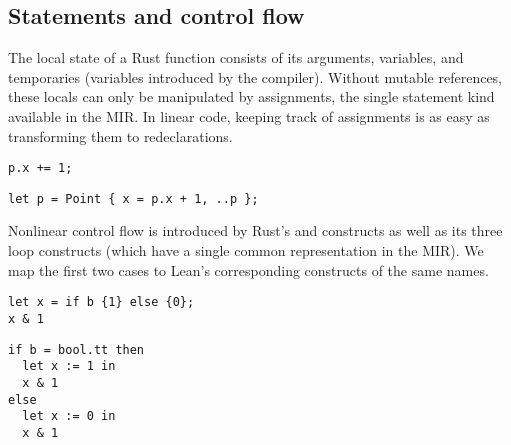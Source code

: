 \subsection{Statements and control flow}

The local state of a Rust function consists of its arguments, variables, and
temporaries (variables introduced by the compiler). Without mutable references,
these locals can only be manipulated by assignments, the single statement kind
available in the MIR. In linear code, keeping track of assignments is as easy as
transforming them to redeclarations.

\vspace{1em}\noindent\begin{minipage}{0.4\textwidth}
  \begin{verbatim}
p.x += 1;
  \end{verbatim}
\end{minipage}
\begin{minipage}{0.6\textwidth}
  \begin{verbatim}
let p = Point { x = p.x + 1, ..p };
  \end{verbatim}
\end{minipage}\vspace{1em}

Nonlinear control flow is introduced by Rust's  and 
constructs as well as its three loop constructs (which have a single common
representation in the MIR). We map the first two cases to Lean's corresponding
constructs of the same names.

\vspace{1em}\noindent\begin{minipage}{0.4\textwidth}
  \begin{verbatim}
let x = if b {1} else {0};
x & 1
  \end{verbatim}
\end{minipage}
\begin{minipage}{0.33\textwidth}
\end{minipage}
\begin{minipage}{0.3\textwidth}
  \begin{verbatim}
if b = bool.tt then
  let x := 1 in
  x & 1
else
  let x := 0 in
  x & 1
  \end{verbatim}
\end{minipage}\vspace{1em}

